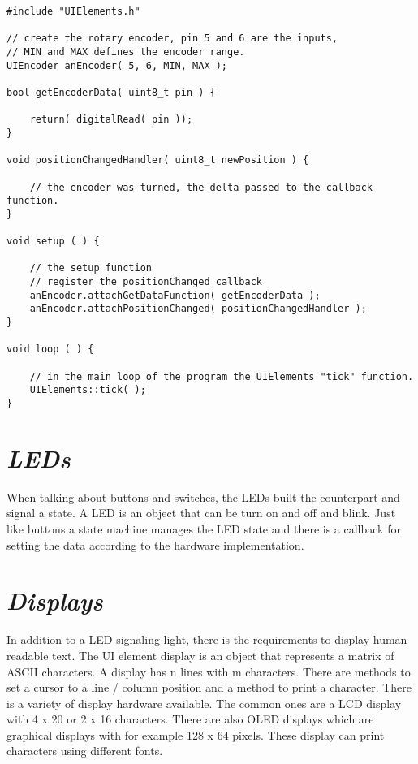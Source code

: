\lstset{language=c++, style=codesnippetstyle}
\begin{lstlisting}
#include "UIElements.h"

// create the rotary encoder, pin 5 and 6 are the inputs, 
// MIN and MAX defines the encoder range.
UIEncoder anEncoder( 5, 6, MIN, MAX );

bool getEncoderData( uint8_t pin ) {

	return( digitalRead( pin ));
}

void positionChangedHandler( uint8_t newPosition ) {

	// the encoder was turned, the delta passed to the callback function.
}

void setup ( ) {
	
	// the setup function 
	// register the positionChanged callback
	anEncoder.attachGetDataFunction( getEncoderData );
    anEncoder.attachPositionChanged( positionChangedHandler );
}

void loop ( ) {

    // in the main loop of the program the UIElements "tick" function.
	UIElements::tick( );
}
\end{lstlisting}
\FloatBarrier

\section{\textit{LEDs}}

When talking about buttons and switches, the LEDs built the counterpart and signal a state. A LED is an object that can be turn on and off and blink. Just like buttons a state machine manages the LED state and there is a callback for setting the data according to the hardware implementation.

\section{\textit{Displays}}

In addition to a LED signaling light, there is the requirements to display human readable text. The UI element display is an object that represents a matrix of ASCII characters. A display has n lines with m characters. There are methods to set a cursor to a line / column position and a method to print a character. There is a variety of display hardware available. The common ones are a LCD display with 4 x 20 or 2 x 16 characters. There are also OLED displays which are graphical displays with for example 128 x 64 pixels. These display can print characters using different fonts.

